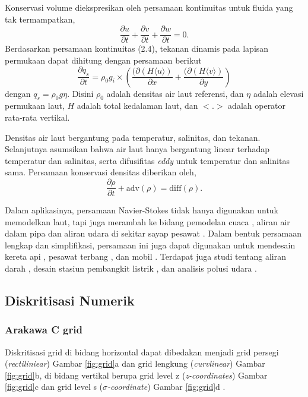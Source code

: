 \begin{spacing}{1.5}
	Konservasi volume diekspresikan oleh persamaan kontinuitas untuk fluida yang tak termampatkan,
	\begin{equation}
		\frac{\partial u}{\partial t} + \frac{\partial v}{\partial t} + \frac{\partial w}{\partial t} = 0.
	\end{equation}
	Berdasarkan persamaan kontinuitas (2.4), tekanan dinamis pada lapisan permukaan dapat dihitung dengan persamaan berikut
	\begin{equation}
		\frac{\partial q_s}{\partial t} = \rho_0 g_i \times \left( \frac{(\partial \left(H \langle u \rangle \right)} {\partial x} + \frac{(\partial \left(H \langle v \rangle \right)} {\partial y}\right)
	\end{equation}
	dengan $q_s = \rho_0 g \eta$. Disini $\rho_0$ adalah densitas air laut referensi, dan $\eta$ adalah elevasi permukaan laut, $H$ adalah total kedalaman laut, dan $<.>$ adalah operator rata-rata vertikal.
	\par Densitas air laut bergantung pada temperatur, salinitas, dan tekanan. Selanjutnya asumsikan bahwa air laut hanya bergantung linear terhadap temperatur dan salinitas, serta difusifitas \textit{eddy} untuk temperatur dan salinitas sama. Persamaan konservasi densitas diberikan oleh,
	\begin{equation}
		\frac{\partial \rho}{\partial t} + \text{adv}(\rho) = \text{diff}(\rho).
	\end{equation}
	
	Dalam aplikasinya, persamaan Navier-Stokes tidak hanya digunakan untuk memodelkan laut, tapi juga merambah ke bidang pemodelan cuaca , aliran air dalam pipa  dan aliran udara di sekitar sayap pesawat . Dalam bentuk persamaan lengkap dan simplifikasi, persamaan ini juga dapat digunakan untuk mendesain kereta api , pesawat terbang , dan mobil . Terdapat juga studi tentang aliran darah , desain stasiun pembangkit listrik , dan analisis polusi udara . 

\subsection[Diskritisasi Numerik]{Diskritisasi Numerik}
\subsubsection[Arakawa C grid]{Arakawa C grid}
	Diskritisasi grid di bidang horizontal dapat dibedakan menjadi grid persegi (\textit{rectiliniear}) Gambar \ref{fig:grid}a dan grid lengkung (\textit{curvlinear}) Gambar \ref{fig:grid}b, di bidang vertikal berupa grid level z (\textit{z-coordinates}) Gambar \ref{fig:grid}c dan grid level s (\textit{$\sigma$-coordinate}) Gambar \ref{fig:grid}d .
	

\end{spacing}
